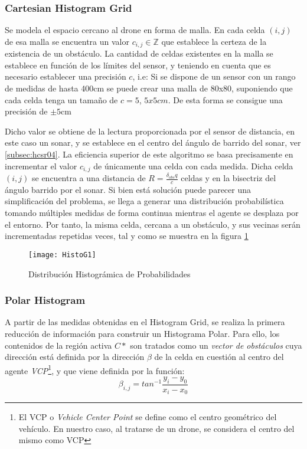 \subsubsection{Cartesian Histogram Grid}
Se modela el espacio cercano al drone en forma de malla. En cada celda $(i,j)$ de esa malla se encuentra un valor $c_{i,j} \in \mathbb{Z}$ que establece la certeza de la existencia de un obstáculo. La cantidad de celdas existentes en la malla se establece en función de los límites del sensor, y teniendo en cuenta que es necesario establecer una precisión $c$, i.e: Si se dispone de un sensor con un rango de medidas de hasta 400cm se puede crear una malla de 80x80, suponiendo que cada celda tenga un tamaño de $c=5$, $5x5cm$. De esta forma se consigue una precisión de $\pm5\text{cm}$

Dicho valor se obtiene de la lectura proporcionada por el sensor de distancia, en este caso un sonar, y se establece en el centro del ángulo de barrido del sonar, ver \ref{subsec:hcsr04}. 
La eficiencia superior de este algoritmo se basa precisamente en incrementar el valor $c_{i,j}$ de únicamente una celda con cada medida. Dicha celda $(i,j)$ se encuentra a una distancia de $R = \frac{\delta_{obs}q}{c}$ celdas y en la bisectriz del ángulo barrido por el sonar.
Si bien está solución puede parecer una simplificación del problema, se llega a generar una distribución probabilística tomando múltiples medidas de forma continua mientras el agente se desplaza por el entorno. Por tanto, la misma celda, cercana a un obstáculo, y sus vecinas serán incrementadas repetidas veces, tal y como se muestra en la figura \ref{fig:histog1}
 \begin{figure}[H]
	\centering
	\texttt{[image: HistoG1]}
	\caption{Distribución Histográmica de Probabilidades}\label{fig:histog1}
\end{figure}

\subsubsection{Polar Histogram}
A partir de las medidas obtenidas en el Histogram Grid, se realiza la primera reducción de información para construir un Histograma Polar. Para ello, los contenidos de la región activa $C*$ son tratados como un \textit{vector de obstáculos} cuya dirección está definida por la dirección $\beta$ de la celda en cuestión al centro del agente \textit{VCP}\footnote{El VCP o \textit{Vehicle Center Point} se define como el centro geométrico del vehículo. En nuestro caso, al tratarse de un drone, se considera el centro del mismo como VCP}, y que viene definida por la función:
\begin{equation}
\label{equation:ObsAgAng}
\beta_{i,j}= tan^{-1} \frac{y_i - y_0}{x_i - x_0}
\end{equation}

